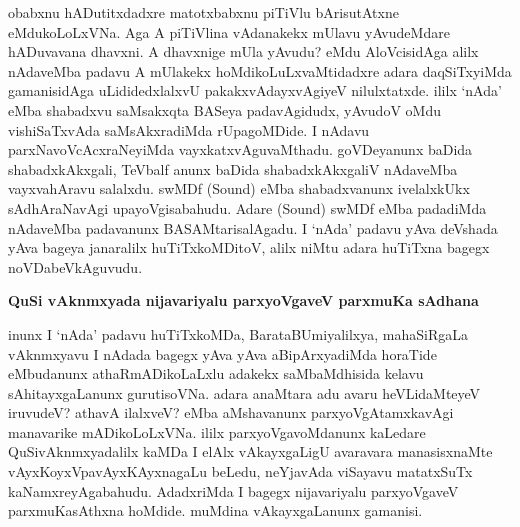obabxnu hADutitxdadxre matotxbabxnu piTiVlu bArisutAtxne eMdukoLoLxVNa. Aga A piTiVlina vAdanakekx mUlavu yAvudeMdare hADuvavana dhavxni. A dhavxnige mUla yAvudu? eMdu AloVcisidAga alilx nAdaveMba padavu A mUlakekx hoMdikoLuLxvaMtidadxre adara daqSiTxyiMda gamanisidAga uLididedxlalxvU pakakxvAdayxvAgiyeV nilulxtatxde. ililx `nAda' eMba shabadxvu saMsakxqta BASeya padavAgidudx, yAvudoV oMdu vishiSaTxvAda saMsAkxradiMda rUpagoMDide. I nAdavu parxNavoVcAcxraNeyiMda vayxkatxvAguvaMthadu. goVDeyanunx baDida shabadxkAkxgali, TeVbalf anunx baDida shabadxkAkxgaliV nAdaveMba vayxvahAravu salalxdu. swMDf {\rm (Sound)} eMba shabadxvanunx ivelalxkUkx sAdhAraNavAgi upayoVgisabahudu. Adare {\rm (Sound)} swMDf eMba padadiMda nAdaveMba padavanunx BASAMtarisalAgadu. I `nAda' padavu yAva deVshada yAva bageya janaralilx huTiTxkoMDitoV, alilx niMtu adara huTiTxna bagegx noVDabeVkAguvudu.

{\bigskip
\noindent
{\large\bf QuSi vAknmxyada nijavariyalu parxyoVgaveV parxmuKa sAdhana}}\label{page143}
\medskip

\noindent
inunx I `nAda' padavu huTiTxkoMDa, BarataBUmiyalilxya, mahaSiRgaLa vAknmxyavu I nAdada bagegx yAva yAva aBipArxyadiMda horaTide eMbudanunx athaRmADikoLaLxlu adakekx saMbaMdhisida kelavu sAhitayxgaLanunx gurutisoVNa. adara anaMtara adu avaru heVLidaMteyeV iruvudeV? athavA ilalxveV? eMba aMshavanunx parxyoVgAtamxkavAgi manavarike mADikoLoLxVNa. ililx parxyoVgavoMdanunx kaLedare QuSivAknmxyadalilx kaMDa I elAlx vAkayxgaLigU avaravara manasisxnaMte vAyxKoyxVpavAyxKAyxnagaLu beLedu, neYjavAda viSayavu matatxSuTx kaNamxreyAgabahudu. AdadxriMda I bagegx nijavariyalu parxyoVgaveV parxmuKasAthxna hoMdide. muMdina vAkayxgaLanunx gamanisi.

